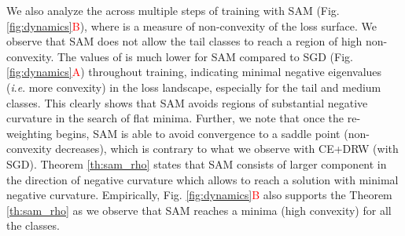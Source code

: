 \documentclass{article}
\newcommand{\ie}{\textit{i}.\textit{e}. }
\begin{document}
We also analyze the  across multiple steps of training with SAM (Fig. \ref{fig:dynamics}\textcolor{red}{B}), where
 is a measure of non-convexity of the loss surface. We observe that SAM does not allow the tail classes to reach a region of high non-convexity. The values of   is much lower for SAM compared to SGD (Fig. \ref{fig:dynamics}\textcolor{red}{A}) throughout training, indicating minimal negative eigenvalues (\ie more convexity) in the loss landscape, especially for the tail and medium classes. This clearly shows that SAM avoids regions of substantial negative curvature in the search of flat minima. Further, we note that once the re-weighting begins, SAM is able to avoid convergence to a saddle point (non-convexity decreases), which is contrary to what we observe with CE+DRW (with SGD). Theorem \ref{th:sam_rho} states that SAM consists of larger component in the direction of negative curvature which allows to reach a solution with minimal negative curvature. Empirically, Fig. \ref{fig:dynamics}\textcolor{red}{B} also supports the Theorem \ref{th:sam_rho} as we observe that SAM reaches a minima (high convexity) for all the classes.  
\end{document}
